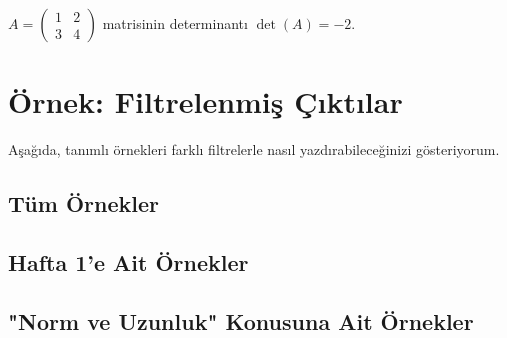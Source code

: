 \begin{exampleauto}
$A=\begin{pmatrix}1 & 2\\3 & 4\end{pmatrix}$ matrisinin determinantı $\det(A) = -2$.
\end{exampleauto}

\section{Örnek: Filtrelenmiş Çıktılar}
Aşağıda, tanımlı örnekleri farklı filtrelerle nasıl yazdırabileceğinizi gösteriyorum.

\subsection{Tüm Örnekler}
\PrintAllExamples

\subsection{Hafta 1'e Ait Örnekler}

\subsection{"Norm ve Uzunluk" Konusuna Ait Örnekler}


